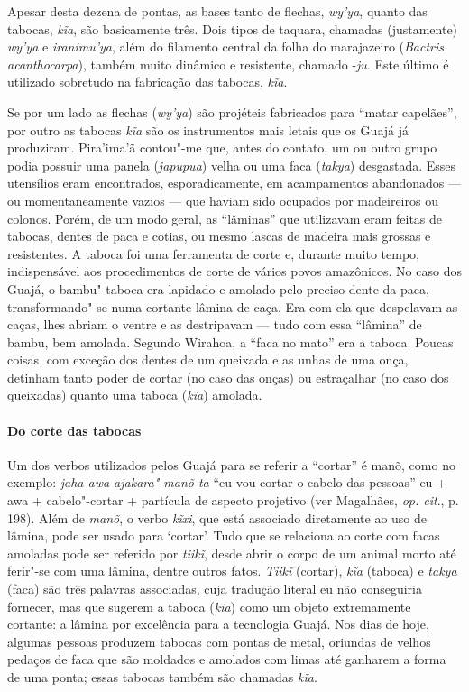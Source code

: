 Apesar desta dezena de pontas, as bases tanto de flechas, \emph{wy'ya},
quanto das tabocas, \emph{kĩa}, são basicamente três. Dois tipos de
taquara, chamadas (justamente) \emph{wy'ya} e \emph{iranimu'ya}, além do
filamento central da folha do marajazeiro (\emph{Bactris acanthocarpa}),
também muito dinâmico e resistente, chamado -\emph{ju}. Este último é
utilizado sobretudo na fabricação das tabocas, \emph{kĩa}.

Se por um lado as flechas (\emph{wy'ya}) são projéteis fabricados para
``matar capelães'', por outro as tabocas \emph{kĩa} são os instrumentos
mais letais que os Guajá já produziram. Pira'ima'ã contou"-me que, antes
do contato, um ou outro grupo podia possuir uma panela (\emph{japupua})
velha ou uma faca (\emph{takya}) desgastada. Esses utensílios eram
encontrados, esporadicamente, em acampamentos abandonados --- ou
momentaneamente vazios --- que haviam sido ocupados por madeireiros ou
colonos. Porém, de um modo geral, as ``lâminas'' que utilizavam eram
feitas de tabocas, dentes de paca e cotias, ou mesmo lascas de madeira
mais grossas e resistentes. A taboca foi uma ferramenta de corte e,
durante muito tempo, indispensável aos procedimentos de corte de vários
povos amazônicos. No caso dos Guajá, o bambu"-taboca era lapidado e
amolado pelo preciso dente da paca, transformando"-se numa cortante
lâmina de caça. Era com ela que despelavam as caças, lhes abriam o
ventre e as destripavam --- tudo com essa ``lâmina'' de bambu, bem amolada.
Segundo Wirahoa, a ``faca no mato'' era a taboca. Poucas coisas, com
exceção dos dentes de um queixada e as unhas de uma onça, detinham tanto
poder de cortar (no caso das onças) ou estraçalhar (no caso dos
queixadas) quanto uma taboca (\emph{kĩa}) amolada.

\paragraph{Do corte das tabocas}

Um dos verbos utilizados pelos Guajá para se referir a ``cortar'' é
manõ, como no exemplo: \emph{jaha awa ajakara"-manõ ta} ``eu vou cortar o
cabelo das pessoas'' eu + awa + cabelo"-cortar + partícula de aspecto
projetivo (ver Magalhães, \emph{op. cit}., p. 198). Além de \emph{manõ}, o
verbo \emph{kĩxi}, que está associado diretamente ao uso de lâmina, pode
ser usado para `cortar'. Tudo que se relaciona ao corte com facas
amoladas pode ser referido por \emph{tiikĩ}, desde abrir o corpo de um
animal morto até ferir"-se com uma lâmina, dentre outros fatos.
\emph{Tiikĩ} (cortar), \emph{kĩa} (taboca) e \emph{takya} (faca) são
três palavras associadas, cuja tradução literal eu não conseguiria
fornecer, mas que sugerem a taboca (\emph{kĩa}) como um objeto
extremamente cortante: a lâmina por excelência para a tecnologia Guajá.
Nos dias de hoje, algumas pessoas produzem tabocas com pontas de metal,
oriundas de velhos pedaços de faca que são moldados e amolados com limas
até ganharem a forma de uma ponta; essas tabocas também são chamadas
\emph{kĩa}.

